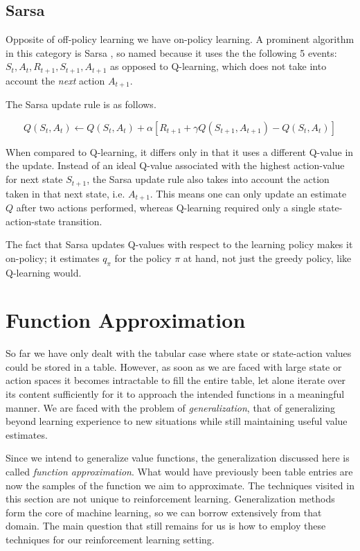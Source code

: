 \subsection{Sarsa}
\label{sub:sarsa}
Opposite of off-policy learning we have on-policy learning.
A prominent algorithm in this category is Sarsa
\parencite{rummery1994line},
so named because it uses the the following 5 events:
$S_t, A_t, R_{t+1}, S_{t+1}, A_{t+1}$
as opposed to Q-learning, which does not take into account
the \textit{next} action $A_{t+1}$.

The Sarsa update rule is as follows.

\begin{equation}
  \label{eq:sarsa}
  Q(S_t, A_t) \leftarrow Q(S_t, A_t) + \alpha \left[ R_{t+1} + \gamma Q(S_{t+1}, A_{t+1}) - Q(S_t, A_t) \right]
\end{equation}

When compared to Q-learning,
it differs only in that it uses a different Q-value in the update.
Instead of an ideal Q-value associated with the highest action-value
for next state $S_{t+1}$,
the Sarsa update rule also takes into account
the action taken in that next state, i.e. $A_{t+1}$.
This means one can only update an estimate $Q$
after two actions performed,
whereas Q-learning required only a single state-action-state transition.

The fact that Sarsa updates Q-values
with respect to the learning policy makes it on-policy;
it estimates $q_\pi$ for the policy $\pi$ at hand,
not just the greedy policy,
like Q-learning would.


\section{Function Approximation}
\label{sec:function_approximation}
So far we have only dealt with the tabular case
where state or state-action values could be stored in a table.
However, as soon as we are faced with large state or action spaces
it becomes intractable to fill the entire table,
let alone iterate over its content sufficiently
for it to approach the intended functions in a meaningful manner.
We are faced with the problem of \textit{generalization},
that of generalizing beyond learning experience to new situations
while still maintaining useful value estimates.

Since we intend to generalize value functions,
the generalization discussed here is called \textit{function approximation}.
What would have previously been table entries
are now the samples of the function we aim to approximate.
The techniques visited in this section are not unique to reinforcement learning.
Generalization methods form the core of machine learning,
so we can borrow extensively from that domain.
The main question that still remains for us is how to employ
these techniques for our reinforcement learning setting.

